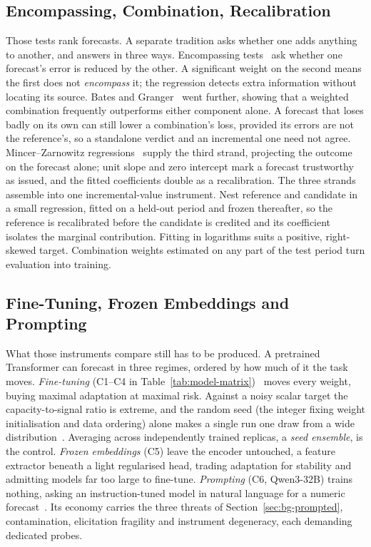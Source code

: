 \subsection{Encompassing, Combination, Recalibration}
\label{sec:bg-methods-combination}

Those tests rank forecasts. A separate tradition asks whether one adds anything to another, and answers in three ways. Encompassing tests~\cite{harvey1998encompassing} ask whether one forecast's error is reduced by the other. A significant weight on the second means the first does not \emph{encompass} it; the regression detects extra information without locating its source. Bates and Granger~\cite{batesgranger1969combination} went further, showing that a weighted combination frequently outperforms either component alone. A forecast that loses badly on its own can still lower a combination's loss, provided its errors are not the reference's, so a standalone verdict and an incremental one need not agree. Mincer--Zarnowitz regressions~\cite{mincer1969evaluation} supply the third strand, projecting the outcome on the forecast alone; unit slope and zero intercept mark a forecast trustworthy as issued, and the fitted coefficients double as a recalibration. The three strands assemble into one incremental-value instrument. Nest reference and candidate in a small regression, fitted on a held-out period and frozen thereafter, so the reference is recalibrated before the candidate is credited and its coefficient isolates the marginal contribution. Fitting in logarithms suits a positive, right-skewed target. Combination weights estimated on any part of the test period turn evaluation into training.

\subsection{Fine-Tuning, Frozen Embeddings and Prompting}
\label{sec:bg-methods-llm}

What those instruments compare still has to be produced. A pretrained Transformer can forecast in three regimes, ordered by how much of it the task moves. \emph{Fine-tuning} (C1--C4 in Table~\ref{tab:model-matrix})~\cite{devlin2019bert} moves every weight, buying maximal adaptation at maximal risk. Against a noisy scalar target the capacity-to-signal ratio is extreme, and the random seed (the integer fixing weight initialisation and data ordering) alone makes a single run one draw from a wide distribution~\cite{dodge2020finetuning}. Averaging across independently trained replicas, a \emph{seed ensemble}, is the control. \emph{Frozen embeddings} (C5) leave the encoder untouched, a feature extractor beneath a light regularised head, trading adaptation for stability and admitting models far too large to fine-tune. \emph{Prompting} (C6, Qwen3-32B) trains nothing, asking an instruction-tuned model in natural language for a numeric forecast~\cite{lopezlira2023chatgpt}. Its economy carries the three threats of Section~\ref{sec:bg-prompted}, contamination, elicitation fragility and instrument degeneracy, each demanding dedicated probes.

